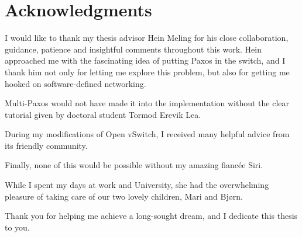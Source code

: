 \cleardoublepage%
\chapter*{Acknowledgments}%
\thispagestyle{empty}%

I would like to thank my thesis advisor Hein Meling for his close
collaboration, guidance, patience and insightful comments throughout this
work.
%
Hein approached me with the fascinating idea of putting Paxos in the
switch, and I thank him not only for letting me explore this problem, but
also for getting me hooked on software-defined networking.

Multi-Paxos would not have made it into the implementation without the
clear tutorial given by doctoral student Tormod Erevik Lea.

During my modifications of Open vSwitch, I received many helpful advice from
its friendly community.

Finally, none of this would be possible without my amazing fiancée Siri.

While I spent my days at work and University, she had the overwhelming
pleasure of taking care of our two lovely children, Mari and Bjørn.

Thank you for helping me achieve a long-sought dream, and I dedicate this
thesis to you.
